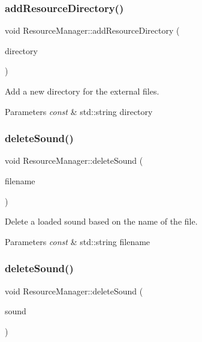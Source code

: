 \subsubsection{\texorpdfstring{add\+Resource\+Directory()}{addResourceDirectory()}}
{\footnotesize\ttfamily void Resource\+Manager\+::add\+Resource\+Directory (\begin{DoxyParamCaption}\item[{const std\+::string \&}]{directory }\end{DoxyParamCaption})}



Add a new directory for the external files. 


\begin{DoxyParams}{Parameters}
{\em const} & std\+::string directory \\
\hline
\end{DoxyParams}
\mbox{\label{class_resource_manager_a8203e72ff90185317afb3de075c3a687}} 
\subsubsection{\texorpdfstring{delete\+Sound()}{deleteSound()}\hspace{0.1cm}{\footnotesize\ttfamily [1/2]}}
{\footnotesize\ttfamily void Resource\+Manager\+::delete\+Sound (\begin{DoxyParamCaption}\item[{const std\+::string \&}]{filename }\end{DoxyParamCaption})}



Delete a loaded sound based on the name of the file. 


\begin{DoxyParams}{Parameters}
{\em const} & std\+::string filename \\
\hline
\end{DoxyParams}
\mbox{\label{class_resource_manager_a77f65cbaa94708fd7a5a17e5991dc22d}} 
\subsubsection{\texorpdfstring{delete\+Sound()}{deleteSound()}\hspace{0.1cm}{\footnotesize\ttfamily [2/2]}}
{\footnotesize\ttfamily void Resource\+Manager\+::delete\+Sound (\begin{DoxyParamCaption}\item[{const sf\+::\+Sound\+Buffer \&}]{sound }\end{DoxyParamCaption})}



